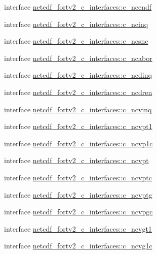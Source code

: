 \begin{DoxyCompactItemize}
\item 
interface \hyperlink{interfacenetcdf__fortv2__c__interfaces_1_1c__ncendf}{netcdf\+\_\+fortv2\+\_\+c\+\_\+interfaces\+::c\+\_\+ncendf}
\item 
interface \hyperlink{interfacenetcdf__fortv2__c__interfaces_1_1c__ncinq}{netcdf\+\_\+fortv2\+\_\+c\+\_\+interfaces\+::c\+\_\+ncinq}
\item 
interface \hyperlink{interfacenetcdf__fortv2__c__interfaces_1_1c__ncsnc}{netcdf\+\_\+fortv2\+\_\+c\+\_\+interfaces\+::c\+\_\+ncsnc}
\item 
interface \hyperlink{interfacenetcdf__fortv2__c__interfaces_1_1c__ncabor}{netcdf\+\_\+fortv2\+\_\+c\+\_\+interfaces\+::c\+\_\+ncabor}
\item 
interface \hyperlink{interfacenetcdf__fortv2__c__interfaces_1_1c__ncdinq}{netcdf\+\_\+fortv2\+\_\+c\+\_\+interfaces\+::c\+\_\+ncdinq}
\item 
interface \hyperlink{interfacenetcdf__fortv2__c__interfaces_1_1c__ncdren}{netcdf\+\_\+fortv2\+\_\+c\+\_\+interfaces\+::c\+\_\+ncdren}
\item 
interface \hyperlink{interfacenetcdf__fortv2__c__interfaces_1_1c__ncvinq}{netcdf\+\_\+fortv2\+\_\+c\+\_\+interfaces\+::c\+\_\+ncvinq}
\item 
interface \hyperlink{interfacenetcdf__fortv2__c__interfaces_1_1c__ncvpt1}{netcdf\+\_\+fortv2\+\_\+c\+\_\+interfaces\+::c\+\_\+ncvpt1}
\item 
interface \hyperlink{interfacenetcdf__fortv2__c__interfaces_1_1c__ncvp1c}{netcdf\+\_\+fortv2\+\_\+c\+\_\+interfaces\+::c\+\_\+ncvp1c}
\item 
interface \hyperlink{interfacenetcdf__fortv2__c__interfaces_1_1c__ncvpt}{netcdf\+\_\+fortv2\+\_\+c\+\_\+interfaces\+::c\+\_\+ncvpt}
\item 
interface \hyperlink{interfacenetcdf__fortv2__c__interfaces_1_1c__ncvptc}{netcdf\+\_\+fortv2\+\_\+c\+\_\+interfaces\+::c\+\_\+ncvptc}
\item 
interface \hyperlink{interfacenetcdf__fortv2__c__interfaces_1_1c__ncvptg}{netcdf\+\_\+fortv2\+\_\+c\+\_\+interfaces\+::c\+\_\+ncvptg}
\item 
interface \hyperlink{interfacenetcdf__fortv2__c__interfaces_1_1c__ncvpgc}{netcdf\+\_\+fortv2\+\_\+c\+\_\+interfaces\+::c\+\_\+ncvpgc}
\item 
interface \hyperlink{interfacenetcdf__fortv2__c__interfaces_1_1c__ncvgt1}{netcdf\+\_\+fortv2\+\_\+c\+\_\+interfaces\+::c\+\_\+ncvgt1}
\item 
interface \hyperlink{interfacenetcdf__fortv2__c__interfaces_1_1c__ncvg1c}{netcdf\+\_\+fortv2\+\_\+c\+\_\+interfaces\+::c\+\_\+ncvg1c}

\end{DoxyCompactItemize}
